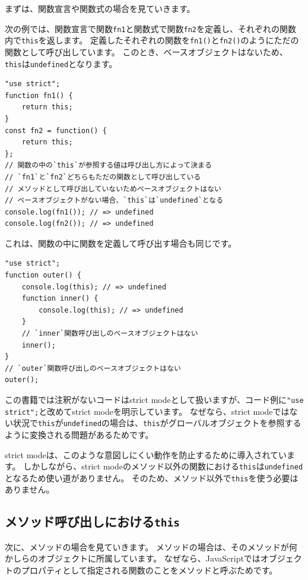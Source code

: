 まずは、関数宣言や関数式の場合を見ていきます。

次の例では、関数宣言で関数\texttt{fn1}と関数式で関数\texttt{fn2}を定義し、それぞれの関数内で\texttt{this}を返します。
定義したそれぞれの関数を\texttt{fn1()}と\texttt{fn2()}のようにただの関数として呼び出しています。
このとき、ベースオブジェクトはないため、\texttt{this}は\texttt{undefined}となります。

\begin{lstlisting}
"use strict";
function fn1() {
    return this;
}
const fn2 = function() {
    return this;
};
// 関数の中の`this`が参照する値は呼び出し方によって決まる
// `fn1`と`fn2`どちらもただの関数として呼び出している
// メソッドとして呼び出していないためベースオブジェクトはない
// ベースオブジェクトがない場合、`this`は`undefined`となる
console.log(fn1()); // => undefined
console.log(fn2()); // => undefined
\end{lstlisting}

これは、関数の中に関数を定義して呼び出す場合も同じです。

\begin{lstlisting}
"use strict";
function outer() {
    console.log(this); // => undefined
    function inner() {
        console.log(this); // => undefined
    }
    // `inner`関数呼び出しのベースオブジェクトはない
    inner();
}
// `outer`関数呼び出しのベースオブジェクトはない
outer();
\end{lstlisting}

この書籍では注釈がないコードはstrict
modeとして扱いますが、コード例に\texttt{"use strict";}と改めてstrict
modeを明示しています。 なぜなら、strict
modeではない状況で\texttt{this}が\texttt{undefined}の場合は、\texttt{this}がグローバルオブジェクトを参照するように変換される問題があるためです。

strict
modeは、このような意図しにくい動作を防止するために導入されています。
しかしながら、strict
modeのメソッド以外の関数における\texttt{this}は\texttt{undefined}となるため使い道がありません。
そのため、メソッド以外で\texttt{this}を使う必要はありません。

\hypertarget{method-this}{%
\subsection{\texorpdfstring{メソッド呼び出しにおける\texttt{this}}{メソッド呼び出しにおけるthis}}\label{method-this}}

次に、メソッドの場合を見ていきます。
メソッドの場合は、そのメソッドが何かしらのオブジェクトに所属しています。
なぜなら、JavaScriptではオブジェクトのプロパティとして指定される関数のことをメソッドと呼ぶためです。

